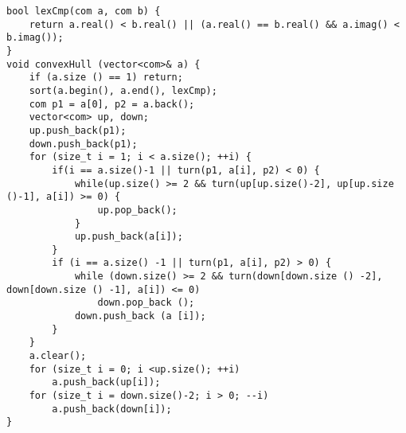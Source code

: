 \begin{lstlisting}
bool lexCmp(com a, com b) {
    return a.real() < b.real() || (a.real() == b.real() && a.imag() < b.imag());
}
void convexHull (vector<com>& a) {
    if (a.size () == 1) return;
    sort(a.begin(), a.end(), lexCmp);
    com p1 = a[0], p2 = a.back();
    vector<com> up, down;
    up.push_back(p1);
    down.push_back(p1);
    for (size_t i = 1; i < a.size(); ++i) {
        if(i == a.size()-1 || turn(p1, a[i], p2) < 0) {
            while(up.size() >= 2 && turn(up[up.size()-2], up[up.size ()-1], a[i]) >= 0) {
                up.pop_back();
            }
            up.push_back(a[i]);
        }
        if (i == a.size() -1 || turn(p1, a[i], p2) > 0) {
            while (down.size() >= 2 && turn(down[down.size () -2], down[down.size () -1], a[i]) <= 0)
                down.pop_back ();
            down.push_back (a [i]);
        }
    }
    a.clear();
    for (size_t i = 0; i <up.size(); ++i)
        a.push_back(up[i]);
    for (size_t i = down.size()-2; i > 0; --i)
        a.push_back(down[i]);
}
\end{lstlisting}
